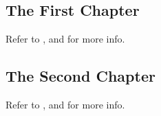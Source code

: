\documentclass{book}
\begin{document}
%	
%	
%	
%	
%	
%		
	
	\begin{bibunit}[plain]
		\chapter{The First Chapter}
		Refer to \cite{Knuth-CT}, and 								\cite{Knuth-TB} for more info.
		\putbib[base1]
	\end{bibunit}
		
	\begin{bibunit}[plain]
		\chapter{The Second Chapter}
		Refer to \cite{MR-PQ}, and 									\cite{3DLM} for more info.
		\putbib[base2]
	\end{bibunit}
	
	
	
	\nocite{*}
	
\end{document}
